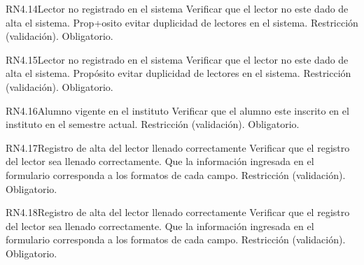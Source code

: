 
\begin{BussinesRule}{RN4.14}{Lector no registrado en el sistema} 
	\BRitem[Descripción:] Verificar que el lector no este dado de alta el sistema. Prop+osito evitar duplicidad de lectores en el sistema.
	\BRitem[Tipo:] Restricción (validación).
	\BRitem[Nivel:] Obligatorio.
\end{BussinesRule}


\begin{BussinesRule}{RN4.15}{Lector no registrado en el sistema} 
	\BRitem[Descripción:] Verificar que el lector no este dado de alta el sistema. Propósito evitar duplicidad de lectores en el sistema.
	\BRitem[Tipo:] Restricción (validación).
	\BRitem[Nivel:] Obligatorio.
\end{BussinesRule}


\begin{BussinesRule}{RN4.16}{Alumno vigente en el instituto} 
	\BRitem[Descripción:] Verificar que el alumno este inscrito en el instituto en el semestre actual.
	\BRitem[Tipo:] Restricción (validación).
	\BRitem[Nivel:] Obligatorio.
\end{BussinesRule}


\begin{BussinesRule}{RN4.17}{Registro de alta del lector llenado correctamente } 
	\BRitem[Descripción:] Verificar que el registro del lector sea llenado correctamente. Que la información ingresada en el formulario corresponda a los formatos de cada campo.
	\BRitem[Tipo:] Restricción (validación).
	\BRitem[Nivel:] Obligatorio.
\end{BussinesRule}


\begin{BussinesRule}{RN4.18}{Registro de alta del lector llenado correctamente } 
	\BRitem[Descripción:] Verificar que el registro del lector sea llenado correctamente. Que la información ingresada en el formulario corresponda a los formatos de cada campo.
	\BRitem[Tipo:] Restricción (validación).
	\BRitem[Nivel:] Obligatorio.
\end{BussinesRule}


